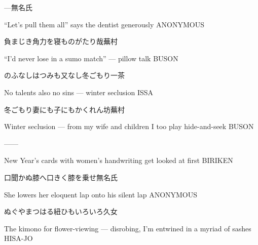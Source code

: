 \begin{haiku}
    {---}\hfill{\FH 無名氏}

    \vin{} ``Let's pull them all''
    \vin{} \vin{} says the dentist
    \vin{} \vin{} \vin{} generously \hspace{\fill} ANONYMOUS
\end{haiku}

\begin{haiku}
    {\FH 負まじき角力を寝ものがたり哉}\hfill{\FH 蕪村}

    \vin{} ``I'd never lose
    \vin{} \vin{} in a sumo match'' ---
    \vin{} \vin{} \vin{} pillow talk \hspace{\fill} BUSON
\end{haiku}

\begin{haiku}
    {\FH のふなしはつみも又なし冬ごもり}\hfill{\FH 一茶}

    \vin{} No talents
    \vin{} \vin{} also no sins ---
    \vin{} \vin{} \vin{} winter seclusion \hspace{\fill} ISSA
\end{haiku}

\begin{haiku}
    {\FH 冬ごもり妻にも子にもかくれん坊}\hfill{\FH 蕪村}

    \vin{} Winter seclusion ---
    \vin{} \vin{} from my wife and children
    \vin{} \vin{} \vin{} I too play hide-and-seek \hspace{\fill} BUSON
\end{haiku}

\begin{haiku}
    ---\hfill{---}

    \vin{} New Year's cards
    \vin{} \vin{} with women's handwriting
    \vin{} \vin{} \vin{} get looked at first \hspace{\fill} BIRIKEN
\end{haiku}

\begin{haiku}
    {口聞かぬ膝へ口きく膝を乗せ}\hfill{\FH 無名氏}

    \vin{} She lowers
    \vin{} \vin{} her eloquent lap
    \vin{} \vin{} \vin{} onto his silent lap \hspace{\fill} ANONYMOUS
\end{haiku}

\begin{haiku}
    {\FH {}ぬぐやまつはる紐{ひも}いろいろ}\hfill{\FH 久女}

    \vin{} The kimono for flower-viewing ---
    \vin{} \vin{} disrobing, I'm entwined in
    \vin{} \vin{} \vin{} a myriad of sashes \hspace{\fill} HISA-JO
\end{haiku}

